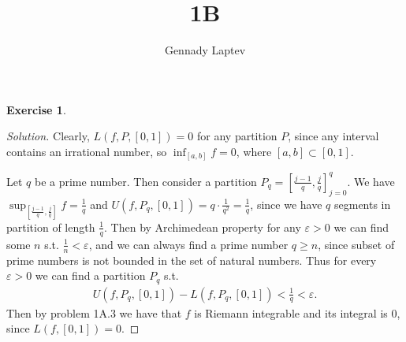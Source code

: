 \documentclass[letterpaper, 11pt, english]{article}
\title{1B}
\author{Gennady Laptev}
\date{}
\theoremstyle{definition}
\theoremstyle{definition}
\newtheorem{problem}{Exercise}
\theoremstyle{definition}
\newenvironment{sol}{\begin{proof}[Solution]}{\end{proof}}
\theoremstyle{plain} %
\theoremstyle{plain} %
\theoremstyle{plain} %
\theoremstyle{plain} %
\theoremstyle{remark}
\begin{document}
\maketitle
\setcounter{section}{0}

\setcounter{problem}{0}
\begin{problem}
\begin{sol}
    Clearly, $ L(f, P, [0,1]) = 0 $ for any partition $ P $,
    since any interval contains an irrational number, so
    $ \inf_{[a,b]} f = 0 $, where $ [a,b] \subset [0,1] $.

    Let $ q $ be a prime number. Then consider a partition
    $ P_q = [\frac{j-1}{q}, \frac{j}{q}]_{j = 0}^{q} $.
    We have $ \sup_{[\frac{j-1}{q}, \frac{j}{q}]} f = \frac{1}{q} $ 
    and $ U(f, P_q, [0,1]) = q \cdot \frac{1}{q^2} = \frac{1}{q}$,
    since we have $ q $ segments in partition of length $ \frac{1}{q} $.
    Then by Archimedean property for any $ \varepsilon > 0 $ we can find some
    $ n $ s.t. $ \frac{1}{n} < \varepsilon $, and we can always find a prime number $ q \geq n$, 
    since subset of prime numbers is not bounded in the set of natural numbers.
    Thus for every $ \varepsilon > 0 $ we can find a partition $ P_q $ s.t.
    \begin{gather*}
        U(f, P_q, [0,1]) - L(f, P_q, [0,1]) < \frac{1}{q}  < \varepsilon.
    \end{gather*}
    Then by problem 1A.3 we have that $ f $ is Riemann integrable and its integral is 0,
    since $ L(f,[0,1]) = 0 $.
\end{sol}
\end{problem}
\end{document}
